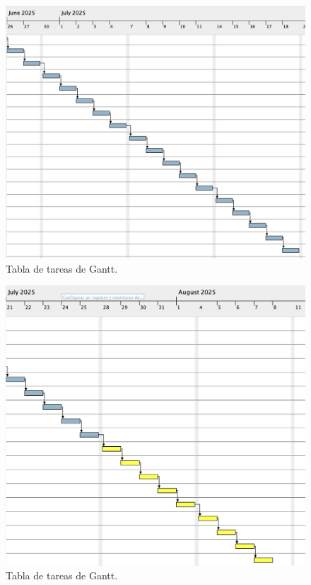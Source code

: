 \documentclass[
11pt, %
]{charter}
\begin{document}
\begin{figure}[htpb]
\centering 
\includegraphics[width=.99\textwidth]{./Figuras/gantt-4.png}
\caption{Tabla de tareas de Gantt.}
\label{fig:diagBloques}
\end{figure}

\begin{figure}[htpb]
\centering 
\includegraphics[width=.99\textwidth]{./Figuras/gantt-5.png}
\caption{Tabla de tareas de Gantt.}
\label{fig:diagBloques}
\end{figure}
\end{document}
